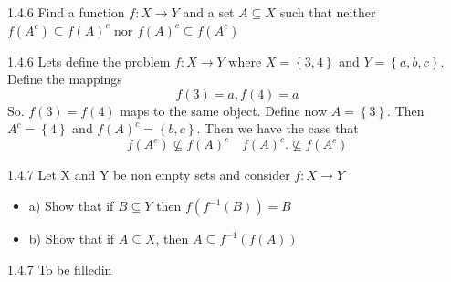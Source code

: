 \documentclass[a4paper,norsk]{article}
\begin{document}
\begin{oppgavebox}{1.4.6}{}
Find a function $ f: X\rightarrow Y $ and a set $ A \subseteq X $ such that neither $ f \left( A^c \right) \subseteq f \left( A \right) ^c  $ nor $ f \left( A \right) ^c \subseteq f \left( A^c \right)  $ 

\begin{proofbox}{1.4.6}{}
  Lets define the problem $ f : X \rightarrow Y $ where $ X = \left\{ 3, 4 \right\}  $ and $ Y = \left\{ a, b, c \right\}  $. Define the mappings
  \[
      f(3) = a, f(4) =a
  \]
  So. $ f(3) =f(4) $ maps to the same object. Define now $ A = \left\{ 3 \right\}  $. Then $ A^ c= \left\{ 4 \right\}  $ and 
  $ f(A)^c = \left\{ b, c \right\}  $.  Then we have the case that 
  \[
      f(A^c) \nsubseteq f(A)^ c \quad f(A)^c. \nsubseteq f(A^c)
  \]
\end{proofbox}
\end{oppgavebox}

\begin{oppgavebox}{1.4.7}{}
Let X and Y be non empty sets and consider $ f: X \rightarrow Y $ 
\begin{itemize}
  \item a) Show that if $ B \subseteq Y $ then $ f \left( f^{-1} \left( B \right)  \right) = B $ 
  \item b) Show that if $ A \subseteq X $, then $ A \subseteq f^{-1} \left( f \left( A \right)  \right)  $ 
\end{itemize}

\begin{proofbox}{1.4.7}{}
  To be filledin
\end{proofbox}
\end{oppgavebox}
\end{document}
